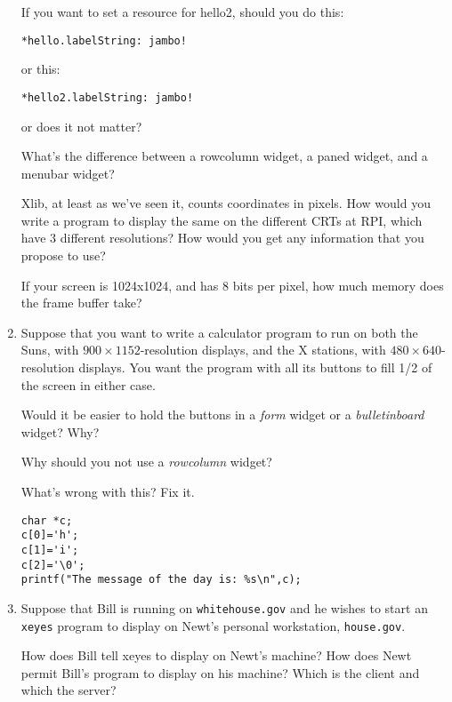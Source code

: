 \documentclass[twoside]{article}
\begin{document}
\begin{enumerate}
If you want to set a resource for hello2, should you do this:
\begin{verbatim}
*hello.labelString: jambo!
\end{verbatim}
or this:
\begin{verbatim}
*hello2.labelString: jambo!
\end{verbatim}
or does it not matter?

 What's the difference between a rowcolumn widget, a paned
widget, and a menubar widget?


Xlib, at least as we've seen it, counts coordinates in pixels.
How would you write a program to display the same on the different
CRTs at RPI, which have 3 different resolutions?  How would you
get any information that you propose to use?



If your screen is 1024x1024, and has 8 bits per pixel, how much
memory does the frame buffer take?


\item
Suppose that you want to write a calculator program to run on both
the Suns, with $900\times1152$-resolution displays, and the X stations, with
$480\times640$-resolution displays.  You want the program with all its
buttons to fill 1/2 of the screen in either case.

\begin{enumerate}
    Would it be easier to hold
the buttons in a \emph{form} widget or a \emph{bulletinboard}
widget?  Why?

Why should you not use a \emph{rowcolumn} widget?
\end{enumerate}


What's wrong with this?  Fix it.

\begin{verbatim}
char *c;
c[0]='h';
c[1]='i';
c[2]='\0';
printf("The message of the day is: %s\n",c);
\end{verbatim}


\item
Suppose that Bill is running on \texttt{whitehouse.gov} and he
wishes to start an \verb+xeyes+ program to display on Newt's
personal workstation, 
\texttt{house.gov}.
\begin{enumerate}
 How does Bill tell xeyes to display on Newt's machine?
 How does Newt permit Bill's program to display on his
machine?
 Which is the client and which the server?
\end{enumerate}


\end{enumerate}
\end{document}
